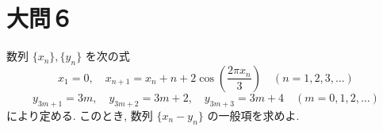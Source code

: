 \documentclass[dvipdfmx,a4paper]{jsarticle}
\begin{document}
    \section{大問６}
    数列 $\{x_n\}, \{y_n\}$ を次の式
    \[
        x_1 = 0, \quad x_{n+1} = x_n + n + 2\cos\left( \frac{2\pi x_n}{3} \right) \quad (n=1, 2, 3, \ldots)
    \]
    \[
        y_{3m+1} = 3m, \quad y_{3m+2} = 3m+2, \quad y_{3m+3} = 3m+4 \quad (m=0, 1, 2, \ldots)
    \]
    により定める. このとき, 数列 $\{x_n - y_n\}$ の一般項を求めよ. 
\end{document}
